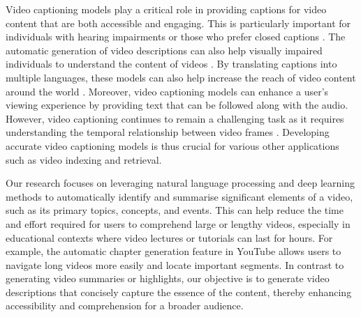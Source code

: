 Video captioning models \cite{Aafaq2019SpatioTemporalDA,Chen2019DeepLF, Liu2018SibNetSC,Pei2019MemoryAttendedRN,Shi2020LearningSC} play a critical role in providing captions for video content that are both accessible and engaging. This is particularly important for individuals with hearing impairments or those who prefer closed captions \cite{intro1}. The automatic generation of video descriptions can also help visually impaired individuals to understand the content of videos \cite{intro4}. By translating captions into multiple languages, these models can also help increase the reach of video content around the world \cite{intro2}. Moreover, video captioning models can enhance a user's viewing experience by providing text that can be followed along with the audio. However, video captioning continues to remain a challenging task as it requires understanding the temporal relationship between video frames \cite{intro2}. Developing accurate video captioning models is thus crucial for various other applications such as video indexing and retrieval.

Our research focuses on leveraging natural language processing and deep learning methods to automatically identify and summarise significant elements of a video, such as its primary topics, concepts, and events. This can help reduce the time and effort required for users to comprehend large or lengthy videos, especially in educational contexts where video lectures or tutorials can last for hours. For example, the automatic chapter generation feature in YouTube allows users to navigate long videos more easily and locate important segments. In contrast to generating video summaries or highlights, our objective is to generate video descriptions that concisely capture the essence of the content, thereby enhancing accessibility and comprehension for a broader audience.